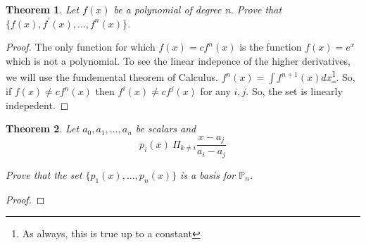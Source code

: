 \documentclass{article}
\theoremstyle{plain}
\newtheorem{theorem}{Theorem}
\theoremstyle{definition}
\begin{document}
\begin{theorem}
	Let $f(x)$ be a polynomial of degree n. Prove that $\{f(x),f^{'}(x),...,f^{n}(x)\}$.
\end{theorem}

\begin{proof}
	The only function for which $f(x) = cf^{n}(x)$ is the function $f(x) = e^{x}$ which is not a polynomial. To see the linear indepence of the higher derivatives, we will use the fundemental theorem of Calculus. $f^{n}(x) = \int f^{n+1}(x)dx$\footnote{As always, this is true up to a constant}. So, if $f(x) \not = cf^{n}(x)$ then $f^{i}(x) \not = cf^{j}(x)$ for any $i , j$. So, the set is linearly indepedent.
\end{proof}

\begin{theorem}
	Let $a_{0},a_{1},...,a_{n}$ be scalars and $$p_{i}(x) \ \Pi_{k \not = i} \frac{x - a_{j}}{a_{i} - a_{j}}$$

	Prove that the set $\{ p_{1}(x), ..., p_{n}(x) \}$ is a basis for $\mathbb{P}_{n}$.
\end{theorem}

\begin{proof}

\end{proof}
\end{document}
